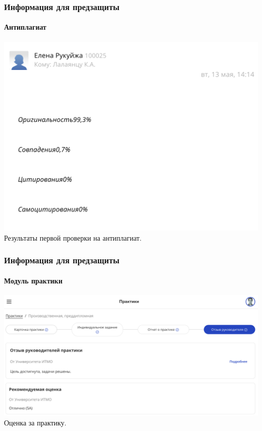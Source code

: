 \documentclass{beamer} %
\begin{document}
\begin{frame}
  \frametitle{Информация для предзащиты}
  \framesubtitle{Антиплагиат}
  \centering
  \includegraphics[width=0.8\linewidth]{images/presentation/antiplagiat.png}\\
  \small Результаты первой проверки на антиплагиат.
\end{frame}

\begin{frame}
  \frametitle{Информация для предзащиты}
  \framesubtitle{Модуль практики}
  \centering
  \includegraphics[width=1\linewidth]{images/presentation/practice.png}\\
  \small Оценка за практику.
\end{frame}
\end{document}
